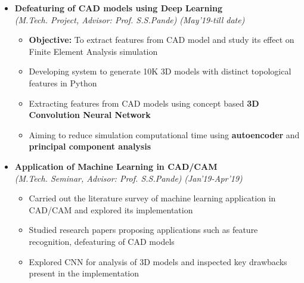 \documentclass[a4paper,10pt]{article}
\begin{document}
\vspace{-0.05cm}
\begin{itemize}%
\item \textbf{Defeaturing of CAD models using Deep Learning}\\
\emph{(M.Tech. Project, Advisor: Prof. S.S.Pande)} \hfill \emph{(May'19-till date)}
    \vspace{-0.05cm}
	\begin{itemize}[noitemsep,nolistsep]
	\item \textbf{Objective:} To extract features from CAD model and study its effect on Finite Element Analysis simulation
	\item Developing system to generate 10K 3D models with distinct topological features in Python
	\item Extracting features from CAD models using concept based \textbf{3D Convolution Neural Network}
	\item Aiming to reduce simulation computational time using \textbf{autoencoder} and \textbf{principal component analysis}
    \end{itemize}
    
\item \textbf{Application of Machine Learning in CAD/CAM} \\
\emph{(M.Tech. Seminar, Advisor: Prof. S.S.Pande)} \hfill \emph{(Jan'19-Apr'19)}
    \vspace{-0.05cm}
	\begin{itemize}[noitemsep,nolistsep]
    \item Carried out the literature survey of machine learning application in CAD/CAM and explored its implementation %
     \item Studied research papers proposing applications such as feature recognition, defeaturing of CAD models
    \item Explored CNN for analysis of 3D models and inspected key drawbacks present in the implementation
	\end{itemize}
\end{itemize}
\end{document}
